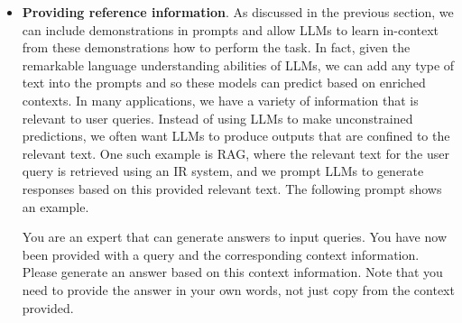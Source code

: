 \begin{itemize}
\begin{tcolorbox}
    \vspace{0.5em}

    Solution: $\{*\mathrm{solution}*\}$

    \underline{\hspace{2em}}

    \endgroup

    \end{tcolorbox}
    \vspace{0.5em}

    The prompts presented here are closely related to a long line of research on reasoning problems in LLMs. It is impossible to provide a complete discussion of all related issues because this topic covers a large family of methods. But we will see a relatively more detailed discussion on how to improve prompting through more reasoning in Section~\ref{sec:advanced-prompting}.

\item \vspace{0.3em} \textbf{Providing reference information}. As discussed in the previous section, we can include demonstrations in prompts and allow LLMs to learn in-context from these demonstrations how to perform the task. In fact, given the remarkable language understanding abilities of LLMs, we can add any type of text into the prompts and so these models can predict based on enriched contexts. In many applications, we have a variety of information that is relevant to user queries. Instead of using LLMs to make unconstrained predictions, we often want LLMs to produce outputs that are confined to the relevant text. One such example is RAG, where the relevant text for the user query is retrieved using an IR system, and we prompt LLMs to generate responses based on this provided relevant text. The following prompt shows an example.

    \vspace{0.5em}
    \begin{tcolorbox}

    \begingroup
    \setlength{\leftskip}{2em}
    \setlength{\rightskip}{2em}

    You are an expert that can generate answers to input queries. You have now been provided with a query and the corresponding context information. Please generate an answer based on this context information. Note that you need to provide the answer in your own words, not just copy from the context provided.

    \vspace{0.5em}


\end{tcolorbox}
\end{itemize}
